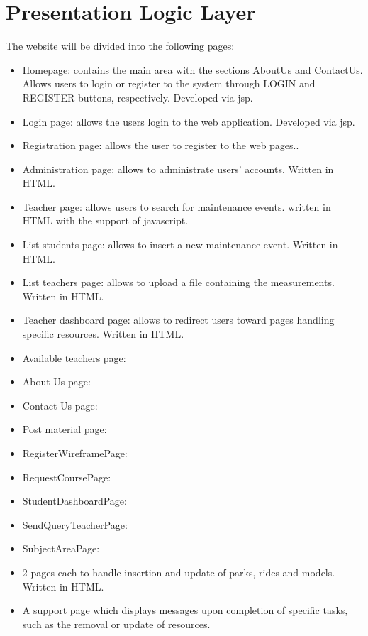 \section{Presentation Logic Layer}
\graphicspath{ {./HW_1/images/} }

The website will be divided into the following pages:
\begin{itemize}
    \item Homepage: contains the main area with the sections AboutUs and ContactUs. Allows users to login or register to the system through LOGIN and REGISTER buttons, respectively. Developed via jsp.
    \item Login page: allows the users login to the web application. Developed via jsp.
    \item Registration page: allows the user to register to the web pages..
    \item Administration page: allows to administrate users’ accounts. Written in HTML.
    \item Teacher page: allows users to search for maintenance events. written in HTML with the
support of javascript.
    \item List students page: allows to insert a new maintenance event. Written in HTML.
    \item List teachers page: allows to upload a file containing the measurements. Written in HTML.
    \item Teacher dashboard page: allows to redirect users toward pages handling specific resources. Written in HTML.
    \item Available teachers page:
    \item About Us page:
    \item Contact Us page:
    \item Post material page:
    \item RegisterWireframePage:
    \item RequestCoursePage:
    \item StudentDashboardPage:
    \item SendQueryTeacherPage:
    \item SubjectAreaPage:
    \item 2 pages each to handle insertion and update of parks, rides and models. Written in HTML.
    
    \item A support page which displays messages upon completion of specific tasks, such as the removal or update
of resources.
\end{itemize}

